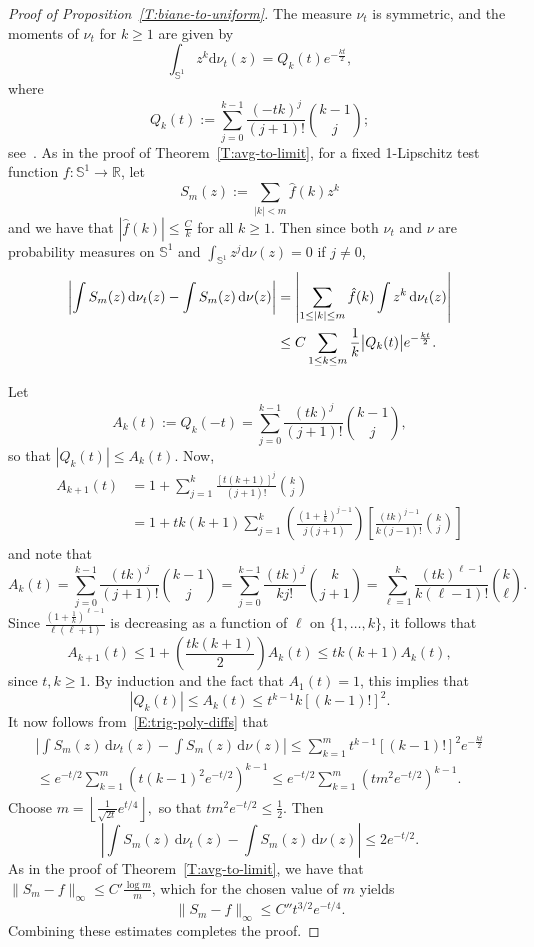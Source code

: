 \documentclass[11pt]{article}
\theoremstyle{definition}
\numberwithin{equation}{section}
\numberwithin{figure}{section}
\numberwithin{table}{section}
\newcommand{\Circle}{\mathbb{S}^1}
\newcommand{\R}{\mathbb{R}}
\newcommand*{\dd}{\mathrm{d}}
\newcommand*{\dnu}{\dd \nu}
\begin{document}
\begin{proof}[Proof of Proposition~\ref{T:biane-to-uniform}]
The measure $\nu_t$ is symmetric, and the moments of $\nu_t$ for $k\ge 1$ are given by
\[
\int_{\Circle}z^k\dnu_t(z)=Q_k(t)e^{-\frac{kt}{2}},
\]
where
\[
Q_k(t) :=\sum_{j=0}^{k-1}\frac{(-tk)^j}{(j+1)!}\binom{k-1}{j};
\]
see~\cite{Biane1997}. As in the proof of Theorem~\ref{T:avg-to-limit}, for a fixed 1-Lipschitz test function $f:\Circle\to\R$, let
\[
S_m(z) := \sum_{|k|<m} \hat{f}(k)z^k
\]
and we have that $|\hat{f}(k)|\le\frac{C}{k}$ for all $k\ge1$. Then since both $\nu_t$ and $\nu$ are probability measures on $\Circle$ and $\int_{\Circle}z^j\dnu(z)=0$ if $j\neq 0$,
\begin{align}
\notag
\left|\int S_m(z)\,\dnu_t(z)-\int S_m(z)\,\dnu(z)\right| &=\left|\sum_{1\le|k|\le m}\hat{f}(k)\int z^k\,\dnu_t(z)\right| \\\label{E:trig-poly-diffs}
&\le C\sum_{1\le k\le m}\frac{1}{k}\big|Q_k(t)\big|e^{-\frac{kt}{2}}.
\end{align}

Let
\[
A_k(t):=Q_k(-t)=\sum_{j=0}^{k-1}\frac{(tk)^j}{(j+1)!}\binom{k-1}{j},
\]
so that $|Q_k(t)|\le A_k(t)$. Now,
\begin{align*}
A_{k+1}(t)&=1+\sum_{j=1}^k\frac{[t(k+1)]^{j}}{(j+1)!}\binom{k}{j} \\
&=1+tk(k+1)\sum_{j=1}^k\left(\frac{\left(1+\frac{1}{k}\right)^{j-1}}{j(j+1)}\right)\left[\frac{(tk)^{j-1}}{k(j-1)!}\binom{k}{j}\right]
\end{align*}
and note that
\[
A_k(t)=\sum_{j=0}^{k-1}\frac{(tk)^j}{(j+1)!}\binom{k-1}{j}=\sum_{j=0}^{k-1}\frac{(tk)^j}{kj!}\binom{k}{j+1}=\sum_{\ell=1}^k\frac{(tk)^{\ell-1}}{k(\ell-1)!}\binom{k}{\ell}.
\]
Since $\frac{\left(1+\frac{1}{k}\right)^{\ell-1}}{\ell(\ell+1)}$ is decreasing as a function of $\ell$ on $\{1,\ldots,k\}$, it follows that
\[
A_{k+1}(t)\le 1+\left(\frac{tk(k+1)}{2}\right)A_k(t)\le tk(k+1)A_k(t),
\]
since $t,k\ge 1$. By induction and the fact that $A_1(t)=1$, this implies that
\[
|Q_k(t)|\le A_k(t)\le t^{k-1}k[(k-1)!]^2.
\]
It now follows from~\eqref{E:trig-poly-diffs} that
\begin{multline*}
\left|\int S_m(z)\,\dnu_t(z)-\int S_m(z)\,\dnu(z)\right|
\le \sum_{k=1}^mt^{k-1}[(k-1)!]^2e^{-\frac{kt}{2}}\\
\le e^{-t/2}\sum_{k=1}^m\left(t(k-1)^2e^{-t/2}\right)^{k-1}\le e^{-t/2}\sum_{k=1}^m\left(tm^2e^{-t/2}\right)^{k-1}.
\end{multline*}
Choose $m=\left\lfloor\frac{1}{\sqrt{2t}}e^{t/4}\right\rfloor,$ so that $tm^2e^{-t/2}\le\frac{1}{2}$. Then
\[
\left|\int S_m(z)\,\dnu_t(z)-\int S_m(z)\,\dnu(z)\right|\le 2e^{-t/2}.
\]
As in the proof of Theorem~\ref{T:avg-to-limit}, we have that $\|S_m-f\|_\infty\le C'\frac{\log m}{m}$, which for the chosen value of $m$ yields
\[
\|S_m-f\|_\infty\le C''t^{3/2}e^{-t/4}.
\]
Combining these estimates completes the proof.
\end{proof}
\end{document}
